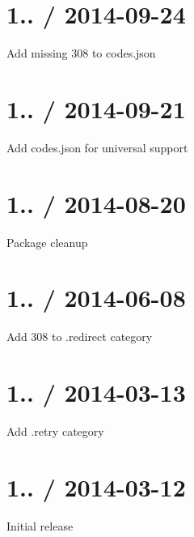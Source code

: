 \section*{1.. / 2014-\/09-\/24 }


\begin{DoxyItemize}
\item Add missing 308 to {\ttfamily codes.\+json}
\end{DoxyItemize}

\section*{1.. / 2014-\/09-\/21 }


\begin{DoxyItemize}
\item Add {\ttfamily codes.\+json} for universal support
\end{DoxyItemize}

\section*{1.. / 2014-\/08-\/20 }


\begin{DoxyItemize}
\item Package cleanup
\end{DoxyItemize}

\section*{1.. / 2014-\/06-\/08 }


\begin{DoxyItemize}
\item Add 308 to {\ttfamily .redirect} category
\end{DoxyItemize}

\section*{1.. / 2014-\/03-\/13 }


\begin{DoxyItemize}
\item Add {\ttfamily .retry} category
\end{DoxyItemize}

\section*{1.. / 2014-\/03-\/12 }


\begin{DoxyItemize}
\item Initial release 
\end{DoxyItemize}